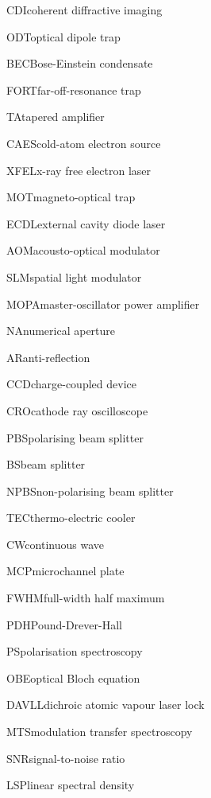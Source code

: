     {CDI}{coherent diffractive imaging}

    {ODT}{optical dipole trap}

    {BEC}{Bose-Einstein condensate}

    {FORT}{far-off-resonance trap}

    {TA}{tapered amplifier}

    {CAES}{cold-atom electron source}

    {XFEL}{x-ray free electron laser}

    {MOT}{magneto-optical trap}

    {ECDL}{external cavity diode laser}

    {AOM}{acousto-optical modulator}

    {SLM}{spatial light modulator}

    {MOPA}{master-oscillator power amplifier}

    {NA}{numerical aperture}

    {AR}{anti-reflection}

    {CCD}{charge-coupled device}

    {CRO}{cathode ray oscilloscope}

    {PBS}{polarising beam splitter}

    {BS}{beam splitter}

    {NPBS}{non-polarising beam splitter}

    {TEC}{thermo-electric cooler}

    {CW}{continuous wave}

    {MCP}{microchannel plate}

    {FWHM}{full-width half maximum}

    {PDH}{Pound-Drever-Hall}
    
    {PS}{polarisation spectroscopy}
    
    {OBE}{optical Bloch equation}
    
    {DAVLL}{dichroic atomic vapour laser lock}

    {MTS}{modulation transfer spectroscopy}

    {SNR}{signal-to-noise ratio}

    {LSP}{linear spectral density}

